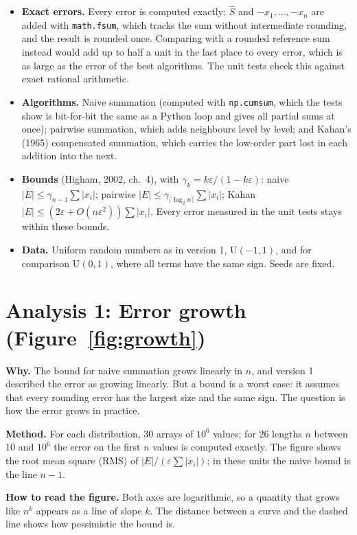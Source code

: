 \documentclass[11pt,a4paper]{article}
\begin{document}
\begin{itemize}
  \item \textbf{Exact errors.} Every error is computed exactly: $\hat S$ and $-x_1, \dots, -x_n$ are added with
  \texttt{math.fsum}, which tracks the sum without intermediate rounding, and the result is rounded once. Comparing with a
  rounded reference sum instead would add up to half a unit in the last place to every error, which is as large as the
  error of the best algorithms. The unit tests check this against exact rational arithmetic.
  \item \textbf{Algorithms.} Naive summation (computed with \texttt{np.cumsum}, which the tests show is bit-for-bit the
  same as a Python loop and gives all partial sums at once); pairwise summation, which adds neighbours level by level;
  and Kahan's (1965) compensated summation, which carries the low-order part lost in each addition into the next.
  \item \textbf{Bounds} (Higham, 2002, ch.~4), with $\gamma_k = k\varepsilon/(1-k\varepsilon)$:
  naive $|E| \le \gamma_{n-1}\sum|x_i|$; pairwise $|E| \le \gamma_{\lceil \log_2 n\rceil}\sum|x_i|$; Kahan
  $|E| \le (2\varepsilon + O(n\varepsilon^2))\sum|x_i|$. Every error measured in the unit tests stays within these bounds.
  \item \textbf{Data.} Uniform random numbers as in version 1, $\mathrm{U}(-1,1)$, and for comparison $\mathrm{U}(0,1)$, where
  all terms have the same sign. Seeds are fixed.
\end{itemize}

\section{Analysis 1: Error growth (Figure~\ref{fig:growth})}

\textbf{Why.} The bound for naive summation grows linearly in $n$, and version 1 described the error as growing linearly.
But a bound is a worst case: it assumes that every rounding error has the largest size and the same sign. The question is
how the error grows in practice.

\textbf{Method.} For each distribution, 30 arrays of $10^6$ values; for 26 lengths $n$ between 10 and $10^6$ the error on the
first $n$ values is computed exactly. The figure shows the root mean square (RMS) of $|E|/(\varepsilon\sum|x_i|)$; in these
units the naive bound is the line $n-1$.

\textbf{How to read the figure.} Both axes are logarithmic, so a quantity that grows like $n^k$ appears as a line of slope
$k$. The distance between a curve and the dashed line shows how pessimistic the bound is.
\end{document}

